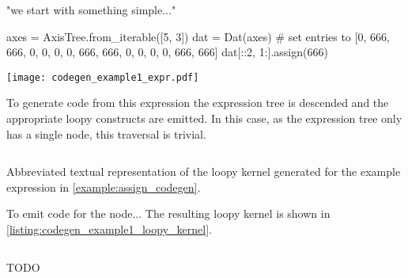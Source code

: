 \documentclass[thesis]{subfiles}
\begin{document}
\begin{example}
\label{example:assign_codegen}

"we start with something simple..."

\begin{pyinline}
  axes = AxisTree.from_iterable([5, 3])
  dat = Dat(axes)
  # set entries to [0, 666, 666, 0, 0, 0, 0, 666, 666, 0, 0, 0, 0, 666, 666]
  dat[::2, 1:].assign(666)
\end{pyinline}


\begin{center}
  \texttt{[image: codegen\_example1\_expr.pdf]}
\end{center}


To generate code from this expression the expression tree is descended and the appropriate loopy constructs are emitted.
In this case, as the expression tree only has a single node, this traversal is trivial.

\begin{listing}
  \centering
  \begin{minipage}{.9\textwidth}
    \inputminted{text}{./scripts/artefacts/codegen_example1_loopy_kernel_tidy.txt}
  \end{minipage}
  \caption{
    Abbreviated textual representation of the loopy kernel generated for the example expression in \cref{example:assign_codegen}.
  }
  \label{listing:codegen_example1_loopy_kernel}
\end{listing}

To emit code for the  node...
The resulting loopy kernel is shown in \cref{listing:codegen_example1_loopy_kernel}.

\begin{listing}
  \centering
  \begin{minipage}{.9\textwidth}
    \inputminted{c}{./scripts/artefacts/codegen_example1_c_code_tidy.c}
  \end{minipage}
  \caption{
    TODO
  }
  \label{listing:codegen_example1_c_code}
\end{listing}


\end{example}
\end{document}
